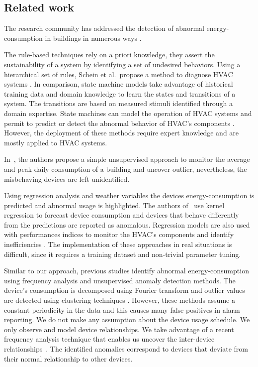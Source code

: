 \subsection{Related work}
The research community has addressed the detection of abnormal energy-consumption in buildings in numerous ways \cite{katipamula:1review2005,katipamula:2review2005}.
% 

The rule-based techniques rely on a priori knowledge, they assert the sustainability of a system by identifying a set of undesired behaviors.
Using a hierarchical set of rules, Schein et al.\ propose a method to diagnose HVAC systems \cite{schein:hvacr2006}.
In comparison, state machine models take advantage of historical training data and domain knowledge to learn the states and transitions of a system.
The transitions are based on measured stimuli identified through a domain expertise.
State machines can model the operation of HVAC systems \cite{patnaik:toist2011} and permit to predict or detect the abnormal behavior of HVAC's components \cite{bellala:buildsys2012}.
However, the deployment of these methods require expert knowledge and are mostly applied to HVAC systems.

In~\cite{seem:energybldg2007}, the authors propose a simple unsupervised approach to monitor the average and peak daily consumption of a building and uncover outlier, nevertheless, the misbehaving devices are left unidentified.

Using regression analysis and weather variables the devices energy-consumption is predicted and abnormal usage is highlighted.
The authors of~\cite{brown:buildperf2012} use kernel regression to forecast device consumption and devices that behave differently from the predictions are reported as anomalous.
Regression models are also used with performances indices to monitor the HVAC's components and identify inefficiencies \cite{zhou:wiley2009}.
The implementation of these approaches in real situations is difficult, since it requires a training dataset and non-trivial 
parameter tuning.

Similar to our approach, previous studies identify abnormal energy-consumption using frequency analysis and unsupervised anomaly detection methods.
The device's consumption is decomposed using Fourier transform and outlier values are detected using clustering 
techniques \cite{Bellala_buildsys11,wrinch:pes2012,chen:aaaiw2011}. %
However, these methods assume a constant periodicity in the data and this causes many false positives in alarm reporting.  %
We do not make any assumption about the device usage schedule.  We only observe and model device relationships.
We take advantage of a recent frequency analysis technique that enables us uncover the inter-device relationships~\cite{romain:iotapp12}.
The identified anomalies correspond to devices that deviate from their normal relationship to other devices.

